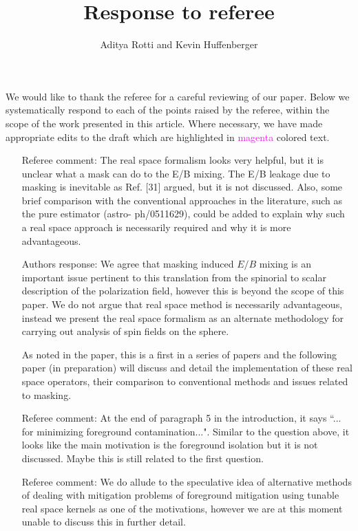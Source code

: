 \documentclass[12pt]{article}
\begin{document}
\title{Response to referee}
\author{Aditya Rotti and Kevin Huffenberger}
\date{}
\maketitle


We would like to thank the referee for a careful reviewing of our paper.  Below we systematically respond to each of the points raised by the referee, within the scope of the work presented in this article. Where necessary, we have made appropriate edits to the draft which are highlighted in \textcolor{magenta}{magenta} colored text.

\begin{itemize}

\item[{Referee comment: }] The real space formalism looks very helpful, but it is unclear what a mask can do to the E/B mixing. The E/B leakage due to masking is inevitable as Ref. [31] argued, but it is not discussed. Also, some brief comparison with the conventional approaches in the literature, such as the pure estimator (astro- ph/0511629), could be added to explain why such a real space approach is necessarily required and why it is more advantageous.
\item[{Authors response: }] We agree that masking induced $E/B$ mixing is an important issue pertinent to this translation from the spinorial to scalar description of the polarization field, however this is beyond the scope of this paper. We do not argue that real space method is necessarily advantageous, instead we present the real space formalism as an alternate methodology for carrying out analysis of spin fields on the sphere.

As noted in the paper, this is a first in a series of papers and the following paper (in preparation) will discuss and detail the implementation of these real space operators, their comparison to conventional methods and issues related to masking. 

\item[{Referee comment: }]  At the end of paragraph 5 in the introduction, it says ``... for minimizing foreground contamination...". Similar to the question above, it looks like the main motivation is the foreground isolation but it is not discussed.
Maybe this is still related to the first question. 
\item[{Referee comment: }] We do allude to the speculative idea of alternative methods of dealing with mitigation problems of foreground mitigation using tunable real space kernels as one of the motivations, however we are at this moment unable to discuss this in further detail.\\


\end{itemize}
\end{document}
